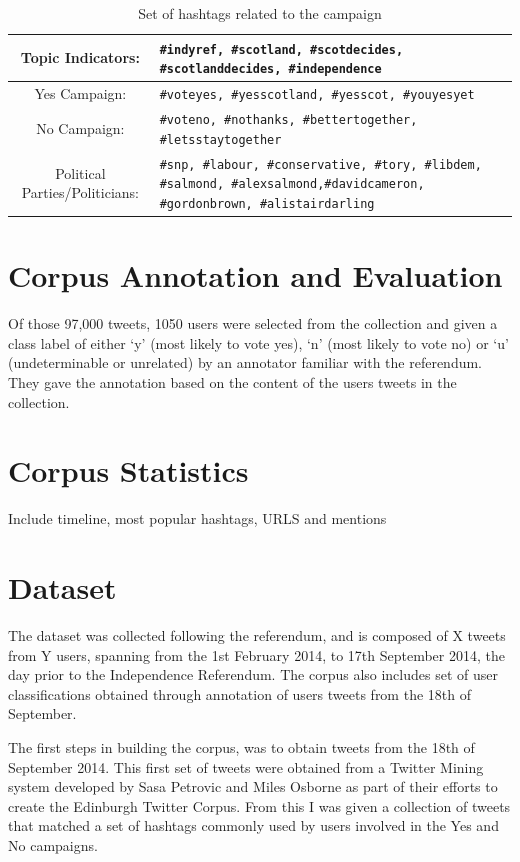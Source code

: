 \documentclass[bsc,frontabs,singlespacing,parskip]{infthesis}     %
\begin{document}
\begin{table}
\begin{center}
    \begin{tabular}{ c p{7cm} }
    \hline
    Topic Indicators: & \tt{\#indyref, \#scotland, \#scotdecides, \#scotlanddecides, \#independence} \\ \hline	
     Yes Campaign: & \tt{\#voteyes, \#yesscotland, \#yesscot, \#youyesyet}\\ \hline
     No Campaign: & \tt{\#voteno, \#nothanks, \#bettertogether, \#letsstaytogether} \\ \hline
    Political Parties/Politicians: & \texttt{\#snp, \#labour, \#conservative, \#tory, \#libdem, \#salmond, \#alexsalmond,\#davidcameron, \#gordonbrown, \#alistairdarling}\\
	\hline
   \end{tabular}
\caption{Set of hashtags related to the campaign}
  \label{tab:hashtagtable}
\end{center}
\end{table}

\section{Corpus Annotation and Evaluation}
\label{sec:annotate}
Of those 97,000 tweets, 1050 users were selected from the collection and given a class label of either `y' (most likely to vote yes), `n' (most likely to vote no) or `u' (undeterminable or unrelated) by an annotator familiar with the referendum. They gave the annotation based on the content of the users tweets in the collection.


\section{Corpus Statistics}

Include timeline, most popular hashtags, URLS and mentions
\section{Dataset}
The dataset was collected following the referendum, and is composed of X tweets from Y users, spanning from the 1st February 2014, to 17th September 2014,  the day prior to the Independence Referendum. The corpus also includes set of user classifications obtained through annotation of  users tweets from the 18th of September.

The first steps in building the corpus, was to obtain tweets from the 18th of September 2014. This first set of tweets were obtained from a Twitter Mining system developed by Sasa Petrovic and Miles Osborne as part of their efforts to create the Edinburgh Twitter Corpus. From this I  was given a collection of tweets that matched a set of hashtags commonly used by users involved in the Yes and No campaigns. 
\end{document}
